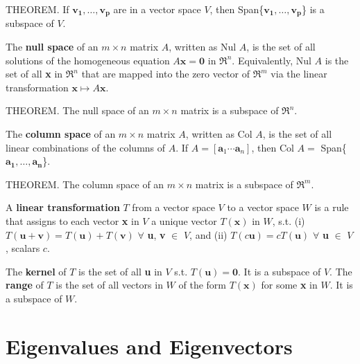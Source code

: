 \documentclass{article}
\begin{document}
\hfill \newline THEOREM. If $\mathbf{v_1},\dots,\mathbf{v_p}$ are in a vector space $V$, then Span\{$\mathbf{v_1},\dots,\mathbf{v_p}$\} is a subspace of $V$. 

\hfill \newline The \textbf{null space} of an $m \times n$ matrix $A$, written as Nul $A$, is the set of all solutions of the homogeneous equation $A\textbf{x}=\textbf{0}$ in $\Re^n$. Equivalently, Nul $A$ is the set of all \textbf{x} in $\Re^n$ that are mapped into the zero vector of $\Re^m$ via the linear transformation $\textbf{x} \mapsto A\textbf{x}$.

\hfill \newline THEOREM. The null space of an $m \times n$ matrix is a subspace of $\Re^n$.

\hfill \newline The \textbf{column space} of an $m \times n$ matrix $A$, written as Col $A$, is the set of all linear combinations of the columns of $A$. If $A = [\textbf{a}_1\cdots \textbf{a}_n]$, then Col $A =$ Span\{$\mathbf{a_1},\dots,\mathbf{a_n}$\}.

\hfill \newline THEOREM. The column space of an $m \times n$ matrix is a subspace of $\Re^m$.

\hfill \newline A \textbf{linear transformation} $T$ from a vector space $V$ to a vector space $W$ is a rule that assigns to each vector \textbf{x} in $V$ a unique vector $T(\textbf{x})$ in $W$, s.t. (i) $T(\textbf{u}+\textbf{v})=T(\textbf{u})+T(\textbf{v})$ $\forall$ \textbf{u}, \textbf{v} $\in$ $V$, and (ii) $T(c\textbf{u})=cT(\textbf{u})$ $\forall$ \textbf{u} $\in$ $V$, scalars $c$.

\hfill \newline The \textbf{kernel} of $T$ is the set of all \textbf{u} in $V$ s.t. $T(\textbf{u})=\textbf{0}$. It is a subspace of $V$. The \textbf{range} of $T$ is the set of all vectors in $W$ of the form $T(\textbf{x})$ for some \textbf{x} in $W$. It is a subspace of $W$.






\section{Eigenvalues and Eigenvectors}
\end{document}
